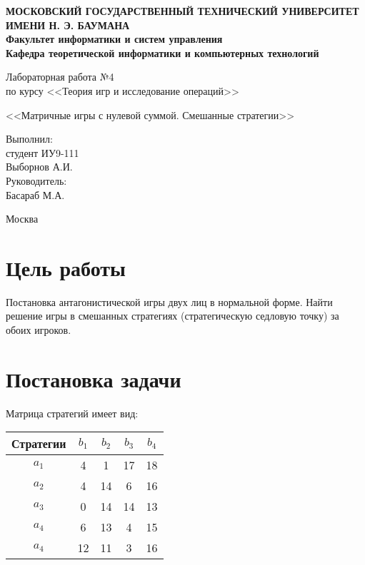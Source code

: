 \documentclass[12pt,a4paper,oneside]{extarticle}
\begin{document}
\pgfplotsset{compat=1.8}

\thispagestyle{empty}
\newpage
{
\centering


\textbf{
МОСКОВСКИЙ ГОСУДАРСТВЕННЫЙ ТЕХНИЧЕСКИЙ УНИВЕРСИТЕТ ИМЕНИ Н. Э. БАУМАНА \\
Факультет информатики и систем управления \\
Кафедра теоретической информатики и компьютерных технологий}
\bigskip
\bigskip
\bigskip
\bigskip
\bigskip
\bigskip
\bigskip

\vfill


Лабораторная работа №4 \\
по курсу <<Теория игр и исследование операций>>

\bigskip

{\large <<Матричные игры с нулевой суммой. Смешанные стратегии>>}
\bigskip

\vfill



\hfill\parbox{4cm} {
Выполнил:\\
студент ИУ9-111 \hfill \\
Выборнов А.И.\hfill \medskip\\
Руководитель:\\
Басараб М.А.\hfill
}


\vspace{\fill}

Москва \number\year
\clearpage
}



\clearpage

\section{Цель работы}
    Постановка антагонистической игры двух лиц в нормальной форме. Найти решение игры в смешанных стратегиях (стратегическую седловую точку) за обоих игроков.

\section{Постановка задачи}
    Матрица стратегий имеет вид:

    \begin{center}
        \begin{tabular}{|c|c|c|c|c|}
            \hline
            Стратегии & $b_1$ & $b_2$ & $b_3$ & $b_4$ \\ \hline
            $a_1$     & 4     & 1     & 17    & 18    \\ \hline
            $a_2$     & 4     & 14    & 6     & 16    \\ \hline
            $a_3$     & 0     & 14    & 14    & 13    \\ \hline
            $a_4$     & 6     & 13    & 4     & 15    \\ \hline
            $a_4$     & 12    & 11    & 3     & 16    \\ \hline
        \end{tabular}
    \end{center}
\end{document}
